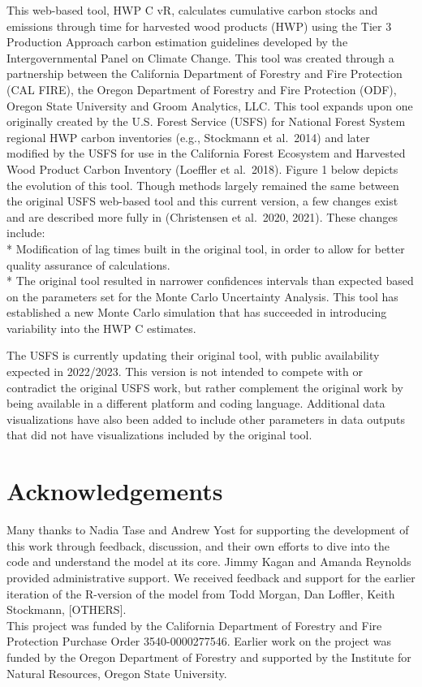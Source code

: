 \documentclass[
]{book}
\begin{document}
This web-based tool, HWP C vR, calculates cumulative carbon stocks and emissions through time for harvested wood products (HWP) using the Tier 3 Production Approach carbon estimation guidelines developed by the Intergovernmental Panel on Climate Change. This tool was created through a partnership between the California Department of Forestry and Fire Protection (CAL FIRE), the Oregon Department of Forestry and Fire Protection (ODF), Oregon State University and Groom Analytics, LLC. This tool expands upon one originally created by the U.S. Forest Service (USFS) for National Forest System regional HWP carbon inventories (e.g., Stockmann et al.~2014) and later modified by the USFS for use in the California Forest Ecosystem and Harvested Wood Product Carbon Inventory (Loeffler et al.~2018). Figure 1 below depicts the evolution of this tool. Though methods largely remained the same between the original USFS web-based tool and this current version, a few changes exist and are described more fully in (Christensen et al.~2020, 2021). These changes include:\\
* Modification of lag times built in the original tool, in order to allow for better quality assurance of calculations.\\
* The original tool resulted in narrower confidences intervals than expected based on the parameters set for the Monte Carlo Uncertainty Analysis. This tool has established a new Monte Carlo simulation that has succeeded in introducing variability into the HWP C estimates.

The USFS is currently updating their original tool, with public availability expected in 2022/2023. This version is not intended to compete with or contradict the original USFS work, but rather complement the original work by being available in a different platform and coding language. Additional data visualizations have also been added to include other parameters in data outputs that did not have visualizations included by the original tool.

\hypertarget{sum-ack}{%
\section{Acknowledgements}\label{sum-ack}}

Many thanks to Nadia Tase and Andrew Yost for supporting the development of this work through feedback, discussion, and their own efforts to dive into the code and understand the model at its core. Jimmy Kagan and Amanda Reynolds provided administrative support. We received feedback and support for the earlier iteration of the R-version of the model from Todd Morgan, Dan Loffler, Keith Stockmann, {[}OTHERS{]}.\\
This project was funded by the California Department of Forestry and Fire Protection Purchase Order 3540-0000277546. Earlier work on the project was funded by the Oregon Department of Forestry and supported by the Institute for Natural Resources, Oregon State University.
\end{document}
